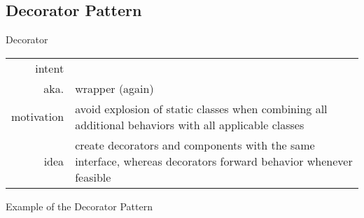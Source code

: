 \subsection{Decorator Pattern}
\begin{frame}{\insertsubsection}
	\begin{fancycolumns}
		\begin{definition}{Decorator \mysource{\gof}}
			\setlength\tabcolsep{1mm}
			\begin{tabularx}{\textwidth}{rX}				
				intent & \mycite{Attach additional responsibilities to an object dynamically. Decorators provide a flexible alternative to subclassing for extending functionality.}\\
				aka. & wrapper (again)\\
				motivation & avoid explosion of static classes when combining all additional behaviors with all applicable classes\\
				idea & create decorators and components with the same interface, whereas decorators forward behavior whenever feasible
			\end{tabularx}
		\end{definition}
		\nextcolumn
	\end{fancycolumns}
\end{frame}

\begin{frame}{Example of the Decorator Pattern }
	\centering\decoratorexample{height=60mm}
\end{frame}


\slideWindowsCalculator

%	

